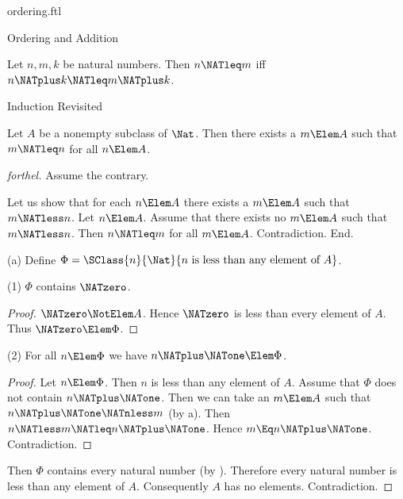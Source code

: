 \documentclass{stex}
\begin{document}
\begin{smodule}{ordering.ftl}
\begin{sfragment}{Ordering and Addition}
  \begin{corollary}[forthel]
    Let $n, m, k$ be natural numbers.
    Then $n \NATleq m$ iff $n \NATplus k \NATleq m \NATplus k$.
  \end{corollary}
\end{sfragment}

\begin{sfragment}{Induction Revisited}


  \begin{proposition}[forthel,name=wellfoundedness of ordering]
    Let $A$ be a nonempty subclass of $\Nat$.
    Then there exists a $m \Elem A$ such that $m \NATleq n$ for all $n \Elem A$.
  \end{proposition}
  \begin{proof}[forthel]
    Assume the contrary.

    Let us show that for each $n \Elem A$ there exists a $m \Elem A$ such that $m \NATless n$.
      Let $n \Elem A$.
      Assume that there exists no $m \Elem A$ such that $m \NATless n$.
      Then $n \NATleq m$ for all $m \Elem A$.
      Contradiction.
    End.

    (a) Define $\Phi = \SClass{n}{\Nat}{n\text{ is less than any element of }A}$.

    (1) $\Phi$ contains $\NATzero$.
    \begin{proof}
      $\NATzero \NotElem A$.
      Hence $\NATzero$ is less than every element of $A$.
      Thus $\NATzero \Elem \Phi$.
    \end{proof}

    (2) For all $n \Elem \Phi$ we have $n \NATplus \NATone \Elem \Phi$.
    \begin{proof}
      Let $n \Elem \Phi$.
      Then $n$ is less than any element of $A$.
      Assume that $\Phi$ does not contain $n \NATplus \NATone$.
      Then we can take an $m \Elem A$ such that $n \NATplus \NATone \NATnless m$ (by a).
      Then $n \NATless m \NATleq n \NATplus \NATone$.
      Hence $m \Eq n \NATplus \NATone$.
      Contradiction.
    \end{proof}

    Then $\Phi$ contains every natural number (by ).
    Therefore every natural number is less than any element of $A$.
    Consequently $A$ has no elements.
    Contradiction.
  \end{proof}



\end{sfragment}
\end{smodule}
\end{document}
